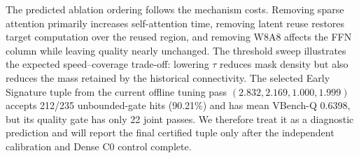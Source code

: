 \begin{table}[htbp]
    \centering
    \caption{Component ablation for Carnator.  Component times are seconds per
    generated request; Full is measured and the remaining rows are idealized estimates ($\dagger$).}
    \label{tab:carnator_component_ablation}
\end{table}

The predicted ablation ordering follows the mechanism costs.  Removing sparse
attention primarily increases self-attention time, removing latent reuse restores
target computation over the reused region, and removing W8A8 affects the FFN
column while leaving quality nearly unchanged.  The threshold sweep illustrates
the expected speed--coverage trade-off: lowering $\tau$ reduces mask density but
also reduces the mass retained by the historical connectivity.  The selected
Early Signature tuple from the current offline tuning pass
$(2.832,2.169,1.000,1.999)$ accepts 212/235
unbounded-gate hits (90.21\%) and has mean VBench-Q 0.6398, but its quality gate
has only 22 joint passes.  We therefore treat it as a diagnostic prediction and
will report the final certified tuple only after the independent calibration and
Dense C0 control complete.
